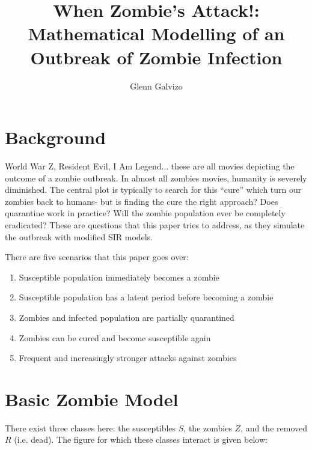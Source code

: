 \documentclass[]{article}
\title{When Zombie’s Attack!: Mathematical Modelling of an Outbreak of Zombie Infection}
\author{Glenn Galvizo}
\begin{document}
\maketitle

\section{Background}
World War Z, Resident Evil, I Am Legend... these are all movies depicting the
outcome of a zombie outbreak. In almost all zombies movies, humanity is severely
diminished. The central plot is typically to search for this “cure” which turn our zombies
back to humans- but is finding the cure the right approach? Does quarantine work in
practice? Will the zombie population ever be completely eradicated? These are questions
that this paper tries to address, as they simulate the outbreak with modified SIR
models.

There are five scenarios that this paper goes over:
\begin{enumerate}
    \item  Susceptible population immediately becomes a zombie
    \item Susceptible population has a latent period before becoming a zombie
    \item Zombies and infected population are partially quarantined
    \item Zombies can be cured and become susceptible again
    \item Frequent and increasingly stronger attacks against zombies
\end{enumerate}

\section{Basic Zombie Model}
There exist three classes here: the susceptibles $S$, the zombies $Z$, and the
removed $R$ (i.e. dead). The figure for which these classes interact is given 
below:

\begin{figure}[H]
\end{figure}
\end{document}
